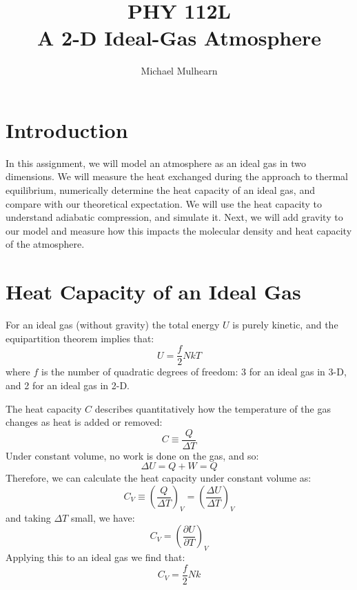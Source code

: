\documentclass[12pt]{article}
\begin{document}
\title{PHY 112L \\ A 2-D Ideal-Gas Atmosphere}
\author{Michael Mulhearn}

\maketitle

\section{Introduction}

In this assignment, we will model an atmosphere as an ideal gas in two
dimensions.  We will measure the heat exchanged during the approach to
thermal equilibrium, numerically determine the heat capacity of an
ideal gas, and compare with our theoretical expectation.  We will use
the heat capacity to understand adiabatic compression, and simulate
it.  Next, we will add gravity to our model and measure how this
impacts the molecular density and heat capacity of the atmosphere.

\section{Heat Capacity of an Ideal Gas}

For an ideal gas (without gravity) the total energy $U$ is purely
kinetic, and the equipartition theorem implies that:
\begin{equation}
U = \frac{f}{2}NkT
\end{equation}
where $f$ is the number of quadratic degrees of freedom: 3 for an
ideal gas in 3-D, and 2 for an ideal gas in 2-D.

The heat capacity $C$ describes quantitatively how the temperature of the gas changes as heat is added or removed:
\begin{equation}
C \equiv \frac{Q}{\Delta T}
\end{equation}
\noindent
Under constant volume, no work is done on the gas, and so:
$$\Delta U = Q + W = Q$$
Therefore, we can calculate the heat capacity under constant volume as:
$$C_V \equiv \left( \frac{Q}{\Delta T}\right)_V = \left( \frac{\Delta U}{\Delta T}\right)_V
$$
and taking $\Delta T$ small, we have:
\begin{equation}
C_V = \left( \frac{\partial U}{\partial T} \right)_V
\end{equation}
Applying this to an ideal gas we find that:
\begin{equation}
\label{eqn:cv}
C_V = \frac{f}{2} N k
\end{equation}
\end{document}
